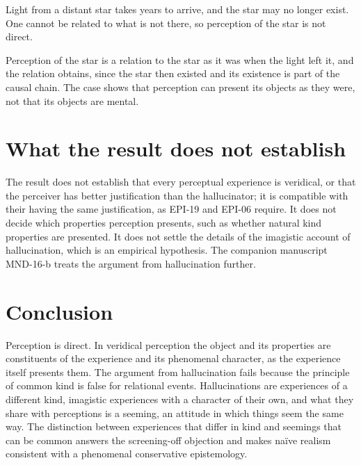 \documentclass{situationist-preprint}
\begin{document}
\begin{objection}\label{o:lag}
Light from a distant star takes years to arrive, and the star may no longer exist. One cannot be related to what is not there, so perception of the star is not direct.
\end{objection}

\begin{reply}
Perception of the star is a relation to the star as it was when the light left it, and the relation obtains, since the star then existed and its existence is part of the causal chain. The case shows that perception can present its objects as they were, not that its objects are mental.
\end{reply}

\section{What the result does not establish}

The result does not establish that every perceptual experience is veridical, or that the perceiver has better justification than the hallucinator; it is compatible with their having the same justification, as EPI-19 and EPI-06 require. It does not decide which properties perception presents, such as whether natural kind properties are presented. It does not settle the details of the imagistic account of hallucination, which is an empirical hypothesis. The companion manuscript MND-16-b treats the argument from hallucination further.

\section{Conclusion}

Perception is direct. In veridical perception the object and its properties are constituents of the experience and its phenomenal character, as the experience itself presents them. The argument from hallucination fails because the principle of common kind is false for relational events. Hallucinations are experiences of a different kind, imagistic experiences with a character of their own, and what they share with perceptions is a seeming, an attitude in which things seem the same way. The distinction between experiences that differ in kind and seemings that can be common answers the screening-off objection and makes naïve realism consistent with a phenomenal conservative epistemology.
\end{document}
